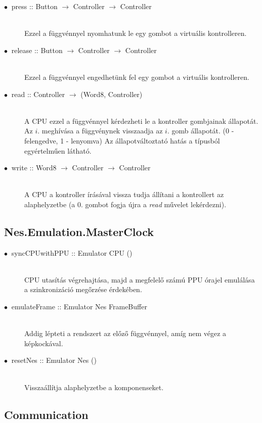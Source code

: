 \begin{description}
	\item[$\bullet\:$ press :: Button $\rightarrow$ Controller $\rightarrow$ Controller] \hfill \\
	Ezzel a függvénnyel nyomhatunk le egy gombot a virtuális kontrolleren.
	\item[$\bullet\:$ release :: Button $\rightarrow$ Controller $\rightarrow$ Controller] \hfill \\
	Ezzel a függvénnyel engedhetünk fel egy gombot a virtuális kontrolleren.
	\item[$\bullet\:$ read :: Controller $\rightarrow$ (Word8, Controller)] \hfill \\
		A CPU ezzel a függvénnyel kérdezheti le a kontroller gombjainak állapotát.
		Az $i.$ meghívása a függvénynek visszaadja az $i.$ gomb állapotát. (0 - felengedve, 1 - lenyomva) Az állapotváltoztató hatás a típusból egyértelműen látható.
	\item[$\bullet\:$ write :: Word8 $\rightarrow$ Controller $\rightarrow$ Controller] \hfill \\
		A CPU a kontroller írásával vissza tudja állítani a kontrollert az alaphelyzetbe (a 0. gombot fogja újra a \emph{read} művelet lekérdezni).
	
\end{description}

\subsection{Nes.Emulation.MasterClock}

\begin{description}
	\item[$\bullet\:$ syncCPUwithPPU :: Emulator CPU ()] \hfill \\
	CPU utasítás végrehajtása, majd a megfelelő számú PPU órajel emulálása a szinkronizáció megőrzése érdekében.
	\item[$\bullet\:$ emulateFrame :: Emulator Nes FrameBuffer] \hfill \\
	Addig lépteti a rendszert az előző függvénnyel, amíg nem végez a képkockával.
	\item[$\bullet\:$ resetNes :: Emulator Nes ()] \hfill \\
	Visszaállítja alaphelyzetbe a komponenseket. 
\end{description}

\subsection{Communication}

